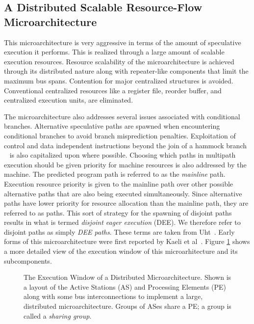 \documentclass{book}
\begin{document}
\subsection{A Distributed Scalable Resource-Flow Microarchitecture}
%
This microarchitecture is very aggressive in terms of
the amount of speculative execution it performs.
This is realized through a large amount of scalable execution
resources.
Resource scalability
of the microarchitecture is achieved through its distributed nature
along with repeater-like components that limit the maximum bus
spans.
Contention for major centralized structures is avoided.
Conventional centralized resources like a register file,
reorder buffer, and centralized execution units, are eliminated.

The microarchitecture also 
addresses several issues associated with conditional branches.
Alternative speculative paths are spawned when encountering conditional
branches to avoid branch misprediction penalties.
Exploitation of control
and data independent instructions beyond the join of a 
hammock branch ~\cite{Fer87,Uht86}
is also capitalized upon where possible.
Choosing which paths in multipath execution should
be given priority for machine resources is also addressed
by the machine.
The predicted program path is referred to as the \textit{mainline} path.  
Execution resource priority is given to the mainline path over
other possible alternative paths that are also being executed 
simultaneously.
Since alternative paths have lower priority for resource allocation
than the mainline path, they are referred
to as  paths.  
This sort of strategy for the spawning of disjoint 
paths results in what is termed {\em disjoint eager execution} (DEE).
We therefore refer to disjoint paths as simply \textit{DEE paths}.
These terms are taken from Uht~\cite{Uht95}.
Early forms of this microarchitecture were first reported
by Kaeli et al~\cite{Kaeli01}.
%
Figure \ref{fig:window} shows a more detailed view
of the execution window of this microarhitecture and its subcomponents.
%
\begin{figure}
\centerline{}
\caption[The Execution Window of a Distributed Microarchitecture]
{{The Execution Window of a Distributed Microarchitecture.}
Shown is a layout of the Active Stations (AS) and Processing Elements (PE)
along with some bus interconnections to implement a large,
distributed microarchitecture. Groups of ASes share a PE; a group is called
a {\em sharing group}.}
\label{fig:window}
\end{figure}
%
\end{document}
